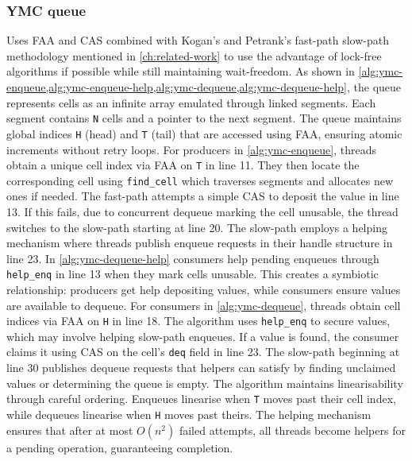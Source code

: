 \subsubsection{\ac{YMC} queue} 
Uses \ac{FAA} and \ac{CAS} combined with Kogan's and Petrank's fast-path slow-path methodology mentioned in \cref{ch:related-work} to use the advantage of lock-free algorithms if possible while still maintaining wait-freedom. As shown in \cref{alg:ymc-enqueue,alg:ymc-enqueue-help,alg:ymc-dequeue,alg:ymc-dequeue-help}, the queue represents cells as an infinite array emulated through linked segments. Each segment contains \texttt{N} cells and a pointer to the next segment. The queue maintains global indices \texttt{H} (head) and \texttt{T} (tail) that are accessed using \ac{FAA}, ensuring atomic increments without retry loops. For producers in \cref{alg:ymc-enqueue}, threads obtain a unique cell index via \ac{FAA} on \texttt{T} in line 11. They then locate the corresponding cell using \texttt{find\_cell} which traverses segments and allocates new ones if needed. The fast-path attempts a simple CAS to deposit the value in line 13. If this fails, due to concurrent dequeue marking the cell unusable, the thread switches to the slow-path starting at line 20. The slow-path employs a helping mechanism where threads publish enqueue requests in their handle structure in line 23. In \cref{alg:ymc-dequeue-help} consumers help pending enqueues through \texttt{help\_enq} in line 13 when they mark cells unusable. This creates a symbiotic relationship: producers get help depositing values, while consumers ensure values are available to dequeue. For consumers in \cref{alg:ymc-dequeue}, threads obtain cell indices via \ac{FAA} on \texttt{H} in line 18. The algorithm uses \texttt{help\_enq} to secure values, which may involve helping slow-path enqueues. If a value is found, the consumer claims it using \ac{CAS} on the cell's \texttt{deq} field in line 23. The slow-path beginning at line 30 publishes dequeue requests that helpers can satisfy by finding unclaimed values or determining the queue is empty. The algorithm maintains linearisability through careful ordering. Enqueues linearise when \texttt{T} moves past their cell index, while dequeues linearise when \texttt{H} moves past theirs. The helping mechanism ensures that after at most $O(n^2)$ failed attempts, all threads become helpers for a pending operation, guaranteeing completion. \cite{FastFetchAndAddWaitFreeQueue}

